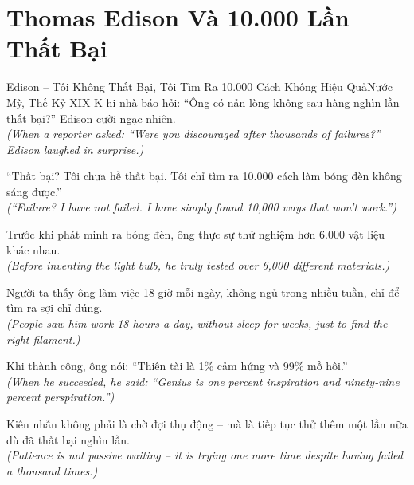 \section{Thomas Edison Và 10.000 Lần Thất Bại}
\begin{truyen}{Edison -- Tôi Không Thất Bại, Tôi Tìm Ra 10.000 Cách Không Hiệu Quả}{Nước Mỹ, Thế Kỷ XIX}
K hi nhà báo hỏi: ``Ông có nản lòng không sau hàng nghìn lần thất bại?'' Edison cười ngạc nhiên.\\
\textit{(When a reporter asked: ``Were you discouraged after thousands of failures?'' Edison laughed in surprise.)}

``Thất bại? Tôi chưa hề thất bại. Tôi chỉ tìm ra 10.000 cách làm bóng đèn không sáng được.''\\
\textit{(``Failure? I have not failed. I have simply found 10,000 ways that won't work.'')}

Trước khi phát minh ra bóng đèn, ông thực sự thử nghiệm hơn 6.000 vật liệu khác nhau.\\
\textit{(Before inventing the light bulb, he truly tested over 6,000 different materials.)}

Người ta thấy ông làm việc 18 giờ mỗi ngày, không ngủ trong nhiều tuần, chỉ để tìm ra sợi chỉ đúng.\\
\textit{(People saw him work 18 hours a day, without sleep for weeks, just to find the right filament.)}

Khi thành công, ông nói: ``Thiên tài là 1\% cảm hứng và 99\% mồ hôi.''\\
\textit{(When he succeeded, he said: ``Genius is one percent inspiration and ninety-nine percent perspiration.'')}

\end{truyen}
\begin{baihoc}
  Kiên nhẫn không phải là chờ đợi thụ động -- mà là tiếp tục thử thêm một lần nữa dù đã thất bại nghìn lần.\\
  \textit{(Patience is not passive waiting -- it is trying one more time despite having failed a thousand times.)}
\end{baihoc}

